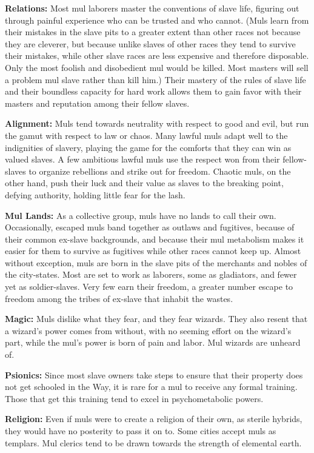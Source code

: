\textbf{Relations:} Most mul laborers master the conventions of slave life, figuring out through painful experience who can be trusted and who cannot. (Muls learn from their mistakes in the slave pits to a greater extent than other races not because they are cleverer, but because unlike slaves of other races they tend to survive their mistakes, while other slave races are less expensive and therefore disposable. Only the most foolish and disobedient mul would be killed. Most masters will sell a problem mul slave rather than kill him.) Their mastery of the rules of slave life and their boundless capacity for hard work allows them to gain favor with their masters and reputation among their fellow slaves.

\textbf{Alignment:} Muls tend towards neutrality with respect to good and evil, but run the gamut with respect to law or chaos. Many lawful muls adapt well to the indignities of slavery, playing the game for the comforts that they can win as valued slaves. A few ambitious lawful muls use the respect won from their fellow-slaves to organize rebellions and strike out for freedom. Chaotic muls, on the other hand, push their luck and their value as slaves to the breaking point, defying authority, holding little fear for the lash.

\textbf{Mul Lands:} As a collective group, muls have no lands to call their own. Occasionally, escaped muls band together as outlaws and fugitives, because of their common ex-slave backgrounds, and because their mul metabolism makes it easier for them to survive as fugitives while other races cannot keep up. Almost without exception, muls are born in the slave pits of the merchants and nobles of the city-states. Most are set to work as laborers, some as gladiators, and fewer yet as soldier-slaves. Very few earn their freedom, a greater number escape to freedom among the tribes of ex-slave that inhabit the wastes.

\textbf{Magic:} Muls dislike what they fear, and they fear wizards. They also resent that a wizard's power comes from without, with no seeming effort on the wizard's part, while the mul's power is born of pain and labor. Mul wizards are unheard of.

\textbf{Psionics:} Since most slave owners take steps to ensure that their property does not get schooled in the Way, it is rare for a mul to receive any formal training. Those that get this training tend to excel in psychometabolic powers.

\textbf{Religion:} Even if muls were to create a religion of their own, as sterile hybrids, they would have no posterity to pass it on to. Some cities accept muls as templars. Mul clerics tend to be drawn towards the strength of elemental earth.

